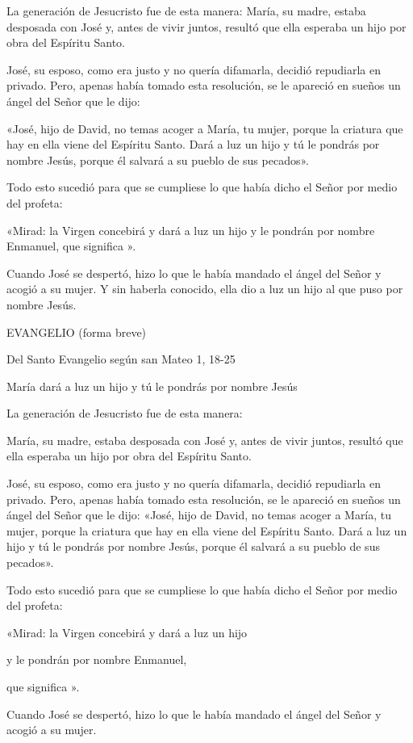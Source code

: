 La generación de Jesucristo fue de esta manera: María, su madre, estaba
desposada con José y, antes de vivir juntos, resultó que ella esperaba
un hijo por obra del Espíritu Santo.

José, su esposo, como era justo y no quería difamarla, decidió
repudiarla en privado. Pero, apenas había tomado esta resolución, se le
apareció en sueños un ángel del Señor que le dijo:

«José, hijo de David, no temas acoger a María, tu mujer, porque la
criatura que hay en ella viene del Espíritu Santo. Dará a luz un hijo y
tú le pondrás por nombre Jesús, porque él salvará a su pueblo de sus
pecados».

Todo esto sucedió para que se cumpliese lo que había dicho el Señor por
medio del profeta:

«Mirad: la Virgen concebirá y dará a luz un hijo y le pondrán por nombre
Enmanuel, que significa ».

Cuando José se despertó, hizo lo que le había mandado el ángel del Señor
y acogió a su mujer. Y sin haberla conocido, ella dio a luz un hijo al
que puso por nombre Jesús.

EVANGELIO (forma breve)

Del Santo Evangelio según san Mateo 1, 18-25

María dará a luz un hijo y tú le pondrás por nombre Jesús

La generación de Jesucristo fue de esta manera:

María, su madre, estaba desposada con José y, antes de vivir juntos,
resultó que ella esperaba un hijo por obra del Espíritu Santo.

José, su esposo, como era justo y no quería difamarla, decidió
repudiarla en privado. Pero, apenas había tomado esta resolución, se le
apareció en sueños un ángel del Señor que le dijo: «José, hijo de David,
no temas acoger a María, tu mujer, porque la criatura que hay en ella
viene del Espíritu Santo. Dará a luz un hijo y tú le pondrás por nombre
Jesús, porque él salvará a su pueblo de sus pecados».

Todo esto sucedió para que se cumpliese lo que había dicho el Señor por
medio del profeta:

«Mirad: la Virgen concebirá y dará a luz un hijo

y le pondrán por nombre Enmanuel,

que significa ».

Cuando José se despertó, hizo lo que le había mandado el ángel del Señor
y acogió a su mujer.

